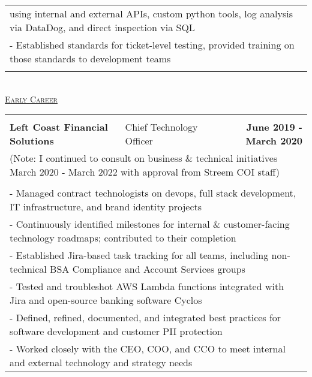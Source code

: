 \documentclass[letterpaper]{article}
\begin{document}
\begin{center}
\begin{tabular}{p{}p{}r}
			\\
				\multicolumn{3}{p{\textwidth}}{\quad\quad\quad using internal and external APIs, custom python tools, log analysis via DataDog, and direct inspection via SQL}
			\\
				\multicolumn{3}{p{\textwidth}}{\quad\quad - Established standards for ticket-level testing, provided training on those standards to development teams}
			\\
			\\
		\end{tabular} \\
		\vspace{2.25in}
		\underline{\large \scshape Early Career}
		\begin{tabular}{p{}p{}r}
		\\
			\\
				\textbf{Left Coast Financial Solutions} &
				\quad\quad\quad\quad\quad Chief Technology Officer &
				\textbf{June 2019 - March 2020\quad}
			\\
				\multicolumn{3}{p{\textwidth}}{(Note: I continued to consult on business \& technical initiatives March 2020 - March 2022 with approval from Streem COI staff)}
			\\
			\\
				\multicolumn{3}{p{\textwidth}}{\quad\quad - Managed contract technologists on devops, full stack development, IT infrastructure, and brand identity projects} 
			\\
				\multicolumn{3}{p{\textwidth}}{\quad\quad - Continuously identified milestones for internal \& customer-facing technology roadmaps; contributed to their completion}  
			\\
				\multicolumn{3}{p{\textwidth}}{\quad\quad - Established Jira-based task tracking for all teams, including non-technical BSA Compliance and Account Services groups}
			\\
				\multicolumn{3}{p{\textwidth}}{\quad\quad - Tested and troubleshot AWS Lambda functions integrated with Jira and open-source banking software Cyclos} 
			\\
				\multicolumn{3}{p{\textwidth}}{\quad\quad - Defined, refined, documented, and integrated best practices for software development and customer PII protection}
			\\
				\multicolumn{3}{p{\textwidth}}{\quad\quad - Worked closely with the CEO, COO, and CCO to meet internal and external technology and strategy needs}
			\\

\end{tabular}
\end{center}
\end{document}
